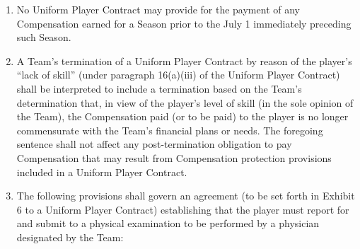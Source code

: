 \documentclass[
]{book}
\begin{document}
\begin{enumerate}
\item
  No Uniform Player Contract may provide for the payment of any Compensation earned for a Season prior to the July 1 immediately preceding such Season.
\item
  A Team's termination of a Uniform Player Contract by reason of the player's ``lack of skill'' (under paragraph 16(a)(iii) of the Uniform Player Contract) shall be interpreted to include a termination based on the Team's determination that, in view of the player's level of skill (in the sole opinion of the Team), the Compensation paid (or to be paid) to the player is no longer commensurate with the Team's financial plans or needs. The foregoing sentence shall not affect any post-termination obligation to pay Compensation that may result from Compensation protection provisions included in a Uniform Player Contract.
\item
  The following provisions shall govern an agreement (to be set forth in Exhibit 6 to a Uniform Player Contract) establishing that the player must report for and submit to a physical examination to be performed by a physician designated by the Team:


\end{enumerate}
\end{document}
